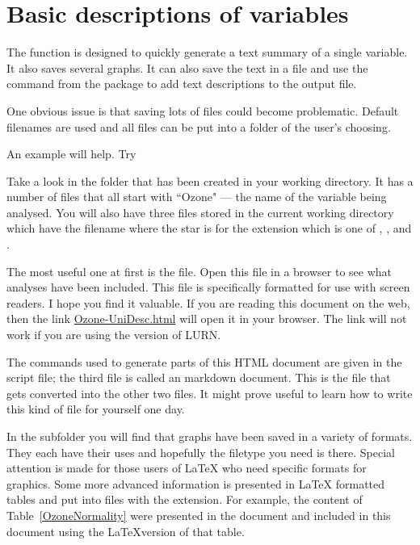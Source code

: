  
\section{Basic descriptions of variables} 
 
The  function is designed to quickly generate a text summary of a single variable. It also saves several graphs. It can also save the text in a file and use the  command from the  package to add text descriptions to the output file. 
 
One obvious issue is that saving lots of files could become problematic. Default filenames are used and all files can be put into a folder of the user's choosing. 
 
An example will help. Try 
\begin{Schunk}
\end{Schunk}
Take a look in the  folder that has been created in your working directory. It has a number of files that all start with ``Ozone" --- the name of the variable being analysed.  You will also have three files stored in the current working directory which have the filename  where the star is for the extension which is one of , , and . 
 
The most useful one at first is the  file. Open this file in a browser to see what analyses have been included. This file is specifically formatted for use with screen readers. I hope you find it valuable. If you are reading this document on the web, then the link \url{Ozone-UniDesc.html} will open it in your browser. The link will not work if you are using the  version of LURN. 
 
The commands used to generate parts of this HTML document are given in the \R{} script file; the third file is called an \R{} markdown document. This is the file that gets converted into the other two files. It might prove useful to learn how to write this kind of file for yourself one day. 
 
In the  subfolder you will find that graphs have been saved in a variety of formats. They each have their uses and hopefully the filetype you need is there. Special attention is made for those users of \LaTeX{} who need specific formats for graphics. Some more advanced information is presented in \LaTeX{} formatted tables and put into files with the  extension. For example, the content of Table~\ref{OzoneNormality} were presented in the  document and included in this document using the \LaTeX{}version of that table. 
 
 
